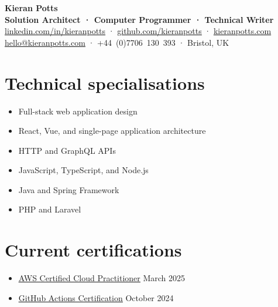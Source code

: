 \documentclass[a4paper,10pt]{article}
\begin{document}
\begin{center}
  \textbf{\Huge{Kieran Potts}} \\
  \vspace{2mm}
  \textbf{Solution Architect · Computer Programmer · Technical Writer} \\
  \vspace{2mm}
  \href{https://linkedin.com/in/kieranpotts}{\uline{linkedin.com/in/kieranpotts}} · \href{https://github.com/kieranpotts}{\uline{github.com/kieranpotts}} · \href{https://kieranpotts.com/}{\uline{kieranpotts.com}} \\
  \href{mailto:hello@kieranpotts.com}{\uline{hello@kieranpotts.com}} · +44~(0)7706~130~393 · Bristol, UK
\end{center}

\vspace{5mm}

\section*{Technical specialisations}

\begin{itemize}
  \item Full-stack web application design
  \item React, Vue, and single-page application architecture
  \item HTTP and GraphQL APIs
  \item JavaScript, TypeScript, and Node.js
  \item Java and Spring Framework
  \item PHP and Laravel
\end{itemize}

\section*{Current certifications}

\begin{itemize}
  \item \href{https://www.credly.com/badges/9801eabb-75e4-4533-a63b-4560c0abae49/}{\uline{AWS Certified Cloud Practitioner}} \hfill March 2025
  \item \href{https://www.credly.com/badges/4ffff536-6b68-40b1-8686-5ffd7f548447/}{\uline{GitHub Actions Certification}} \hfill October 2024
\end{itemize}
\end{document}
